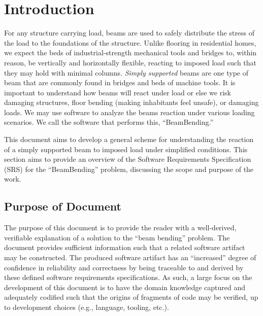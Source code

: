 \documentclass[12pt]{article}
\begin{document}


\section{Introduction}

For any structure carrying load, beams are used to safely distribute the stress
of the load to the foundations of the structure. Unlike flooring in residential
homes, we expect the beds of industrial-strength mechanical tools and bridges
to, within reason, be vertically and horizontally flexible, reacting to imposed
load such that they may hold with minimal columns. \textit{Simply supported}
beams are one type of beam that are commonly found in bridges and beds of
machine tools. It is important to understand how beams will react under load or
else we risk damaging structures, floor bending (making inhabitants feel
unsafe), or damaging loads. We may use software to analyze the beams reaction
under various loading scenarios. We call the software that performs this,
``BeamBending.''

This document aims to develop a general scheme for understanding the reaction of
a simply supported beam to imposed load under simplified conditions. This
section aims to provide an overview of the Software Requirements Specification
(SRS) for the ``BeamBending'' problem, discussing the scope and purpose of the
work.

\subsection{Purpose of Document}

The purpose of this document is to provide the reader with a well-derived,
verifiable explanation of a solution to the ``beam bending'' problem. The
document provides sufficient information such that a related software artifact
may be constructed. The produced software artifact has an ``increased'' degree
of confidence in reliability and correctness by being traceable to and derived
by these defined software requirements specifications. As such, a large focus on
the development of this document is to have the domain knowledge captured and
adequately codified such that the origins of fragments of code may be verified,
up to development choices (e.g., language, tooling, etc.).
\end{document}
